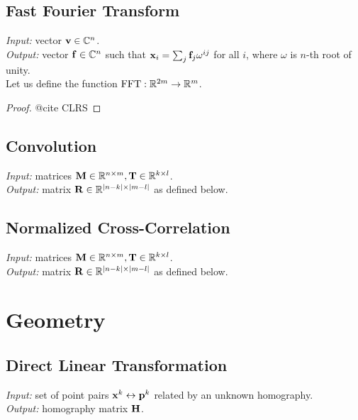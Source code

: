 \subsection{Fast Fourier Transform}
\textit{Input:} vector $\mathbf{v} \in \mathbb{C}^n$.\\
\textit{Output:} vector $\mathbf{f} \in \mathbb{C}^n$ such that $\mathbf{x}_i = \sum_j \mathbf{f}_j \omega^{i j}$ for all $i$, where $\omega$ is $n$-th root of unity.\\

Let us define the function $\mathrm{FFT}: \mathbb{R}^{2m} \rightarrow \mathbb{R}^m$.

\begin{proof}
@cite CLRS
\end{proof}

\subsection{Convolution}

\textit{Input:} matrices $\mathbf{M} \in \mathbb{R}^{n \times m}, \mathbf{T} \in \mathbb{R}^{k \times l}$.\\
\textit{Output:} matrix $\mathbf{R} \in \mathbb{R}^{|n-k| \times |m - l|}$ as defined below.\\

\subsection{Normalized Cross-Correlation}

\textit{Input:} matrices $\mathbf{M} \in \mathbb{R}^{n \times m}, \mathbf{T} \in \mathbb{R}^{k \times l}$.\\
\textit{Output:} matrix $\mathbf{R} \in \mathbb{R}^{|n-k| \times |m - l|}$ as defined below.\\


\section{Geometry}

\subsection{Direct Linear Transformation}

\textit{Input:} set of point pairs $\mathbf{x}^k \leftrightarrow \mathbf{p}^k$ related by an unknown homography.\\
\textit{Output:} homography matrix $\mathbf{H}$.\\


